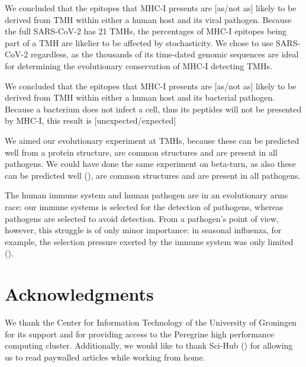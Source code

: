 We concluded that the
epitopes that MHC-I presents are [as/not as] likely 
to be derived from TMH within either a human host and its viral pathogen.
Because the full SARS-CoV-2 has 21 TMHs, the percentages
of MHC-I epitopes being part of a TMH are likelier to be affected by
stochasticity. We chose to use SARS-CoV-2 regardless, as the thousands
of its time-dated genomic sequences are ideal for determining the 
evolutionary conservation of MHC-I detecting TMHs. 

We concluded that the
epitopes that MHC-I presents are [as/not as] likely 
to be derived from TMH within either a human host and its bacterial pathogen.
Because a bacterium does not infect a cell, thus its peptides
will not be presented by MHC-I, this result is [unexpected/expected]

We aimed our evolutionary experiment at TMHs, because these can
be predicted well from a protein structure,
are common structures and are present in all pathogens. 
We could have done the same experiment on beta-turn,
as also these can be predicted well (\cite{petersen2010netturnp}),
are common structures and are present in all pathogens.

The human immune system and human pathogen are in an evolutionary
arms race: our immune systems is selected for the detection
of pathogens, whereas pathogens are selected to avoid detection.
From a pathogen's point of view, however, this struggle 
is of only minor importance:
in seasonal influenza, for example, the selection pressure
exerted by the immune system was only limited (\cite{han2019individual}).


\section{Acknowledgments}

We thank the Center for Information Technology of the University 
of Groningen for its support and for providing access to the Peregrine 
high performance computing cluster. 
Additionally, we would like to thank Sci-Hub (\cite{himmelstein2018sci})
for allowing us to read paywalled articles while working from home.

